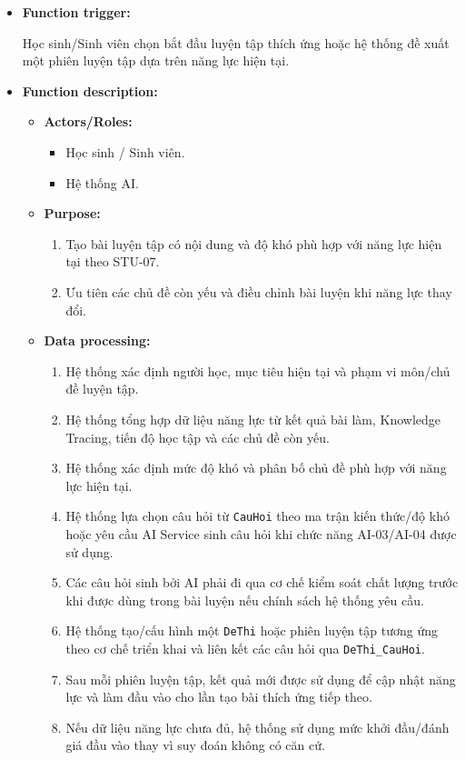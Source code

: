 \documentclass[12pt,a4paper,oneside]{report}
\begin{document}
\begin{itemize}

    \item \textbf{Function trigger:}

    Học sinh/Sinh viên chọn bắt đầu luyện tập thích ứng hoặc hệ thống đề xuất một phiên luyện tập dựa trên năng lực hiện tại.

    \item \textbf{Function description:}

    \begin{itemize}

        \item \textbf{Actors/Roles:}
        \begin{itemize}
            \item Học sinh / Sinh viên.
            \item Hệ thống AI.
        \end{itemize}

        \item \textbf{Purpose:}
        \begin{enumerate}
            \item Tạo bài luyện tập có nội dung và độ khó phù hợp với năng lực hiện tại theo STU-07.
            \item Ưu tiên các chủ đề còn yếu và điều chỉnh bài luyện khi năng lực thay đổi.
        \end{enumerate}

        \item \textbf{Data processing:}
        \begin{enumerate}
            \item Hệ thống xác định người học, mục tiêu hiện tại và phạm vi môn/chủ đề luyện tập.
            \item Hệ thống tổng hợp dữ liệu năng lực từ kết quả bài làm, Knowledge Tracing, tiến độ học tập và các chủ đề còn yếu.
            \item Hệ thống xác định mức độ khó và phân bố chủ đề phù hợp với năng lực hiện tại.
            \item Hệ thống lựa chọn câu hỏi từ \texttt{CauHoi} theo ma trận kiến thức/độ khó hoặc yêu cầu AI Service sinh câu hỏi khi chức năng AI-03/AI-04 được sử dụng.
            \item Các câu hỏi sinh bởi AI phải đi qua cơ chế kiểm soát chất lượng trước khi được dùng trong bài luyện nếu chính sách hệ thống yêu cầu.
            \item Hệ thống tạo/cấu hình một \texttt{DeThi} hoặc phiên luyện tập tương ứng theo cơ chế triển khai và liên kết các câu hỏi qua \texttt{DeThi\_CauHoi}.
            \item Sau mỗi phiên luyện tập, kết quả mới được sử dụng để cập nhật năng lực và làm đầu vào cho lần tạo bài thích ứng tiếp theo.
            \item Nếu dữ liệu năng lực chưa đủ, hệ thống sử dụng mức khởi đầu/đánh giá đầu vào thay vì suy đoán không có căn cứ.
        \end{enumerate}


\end{itemize}
\end{itemize}
\end{document}
